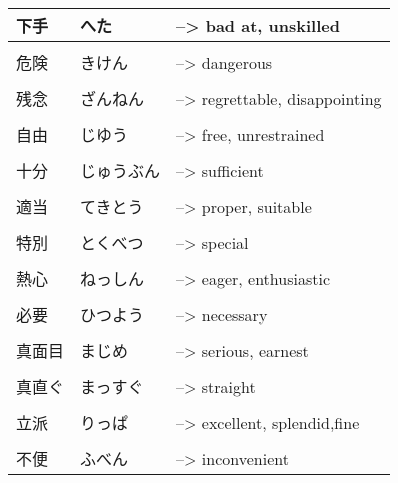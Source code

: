 \documentclass{article}
\begin{document}
\begin{tabular}{ p{1.41cm} | p{3.4cm} l }
下手&へた&--> bad at, unskilled\\ \hline\\[-1em]
危険&きけん&--> dangerous\\ \hline\\[-1em]
残念&ざんねん&--> regrettable, disappointing\\ \hline\\[-1em]
自由&じゆう&--> free, unrestrained\\ \hline\\[-1em]
十分&じゅうぶん&--> sufficient\\ \hline\\[-1em]
適当 	&てきとう&--> proper, suitable\\ \hline\\[-1em]
特別 	&とくべつ &--> special\\ \hline\\[-1em]
熱心 	&ねっしん &--> eager, enthusiastic\\ \hline\\[-1em]
必要 	&ひつよう &--> necessary\\ \hline\\[-1em]
真面目 	&まじめ &--> serious, earnest\\ \hline\\[-1em]
真直ぐ 	&まっすぐ&--> straight\\ \hline\\[-1em]
立派 	&りっぱ &--> excellent, splendid,fine\\ \hline\\[-1em]
不便 	&ふべん &--> inconvenient   %
\end{tabular}
\end{document}
